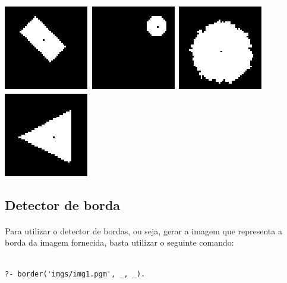 \documentclass{article}
\begin{document}
\begin{center}
\includegraphics[scale=1.00]{texImgs/centroid_img6.eps}
\includegraphics[scale=1.00]{texImgs/centroid_img7.eps}
\includegraphics[scale=1.00]{texImgs/centroid_img8.eps}
\includegraphics[scale=1.00]{texImgs/centroid_img9.eps}
\end{center}


\subsection*{Detector de borda}
\paragraph{}
	Para utilizar o detector de bordas, ou seja, gerar a imagem que representa a borda da imagem fornecida, basta utilizar o seguinte comando:

\begin{center}
\begin{minipage}{13cm}
\begin{Verbatim}

?- border('imgs/img1.pgm', _, _).
\end{Verbatim}
\end{minipage}
\end{center}
\end{document}
